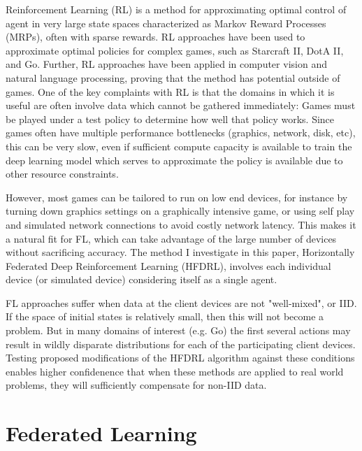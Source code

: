 \documentclass[10pt,journal,compsoc]{IEEEtran}
\begin{document}
Reinforcement Learning (RL) is a method for approximating optimal control of agent in
very large state spaces characterized as Markov Reward Processes (MRPs), often with
sparse rewards. RL approaches have been used to approximate optimal policies
for complex games, such as Starcraft II\cite{CITE_TODO DeepMind SC2}, DotA II\cite{CITE_TODO OpenAI dota papers},
and Go\cite{CITE_TODO alphago}. Further, RL approaches have been applied in computer vision\cite{CITE_TODO points of interest from Gdrive}
and natural language processing\cite{CITE_TODO text game learning}, proving that the method has potential outside
of games. One of the key complaints with RL is that the domains in which it is useful are
often involve data which cannot be gathered immediately: Games must be played under
a test policy to determine how well that policy works. Since games often have multiple
performance bottlenecks (graphics, network, disk, etc), this can be very slow, even if sufficient
compute capacity is available to train the deep learning model which serves to approximate the policy
is available due to other resource constraints.

However, most games can be tailored to run on low end devices, for instance by turning down
graphics settings on a graphically intensive game, or using self play and simulated network
connections to avoid costly network latency. This makes it a natural fit for FL, which can
take advantage of the large number of devices without sacrificing accuracy. The method I
investigate in this paper, Horizontally Federated Deep Reinforcement Learning (HFDRL), involves
each individual device (or simulated device) considering itself as a single agent.

FL approaches suffer when data at the client devices are not "well-mixed", or IID. If the space
of initial states is relatively small, then this will not become a problem. But in many domains
of interest (e.g. Go) the first several actions may result in wildly disparate distributions for
each of the participating client devices. Testing proposed modifications of the HFDRL algorithm
against these conditions enables higher confidenence that when these methods are applied to real
world problems, they will sufficiently compensate for non-IID data.

\section{Federated Learning}
\end{document}
